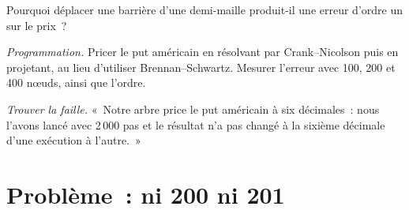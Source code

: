 \begin{exercise}[$\star\star$]\label{exo:dv:trees-and-finite-difference-pricers-in-practice:6}
Pourquoi déplacer une barrière d'une demi-maille produit-il une erreur d'ordre un sur le prix~?
\end{exercise}

\begin{exercise}[$\star\star\star$]\label{exo:dv:trees-and-finite-difference-pricers-in-practice:7}
\emph{Programmation.} Pricer le put américain en résolvant par Crank--Nicolson puis en projetant, au lieu d'utiliser Brennan--Schwartz. Mesurer l'erreur avec 100, 200
et 400 nœuds, ainsi que l'ordre.
\end{exercise}

\begin{exercise}[$\star\star\star$]\label{exo:dv:trees-and-finite-difference-pricers-in-practice:8}
\emph{Trouver la faille.} «~Notre arbre price le put américain à six décimales~: nous l'avons lancé avec 2\,000 pas et le résultat n'a pas changé à la sixième décimale
d'une exécution à l'autre.~»
\end{exercise}

\section{Problème~: ni 200 ni 201}


